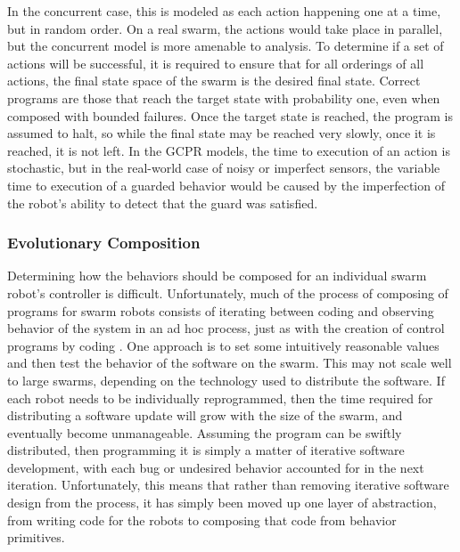\documentclass[]{article}
\begin{document}
In the concurrent case, this is modeled as each action happening one at a time, but in random order. 
On a real swarm, the actions would take place in parallel, but the concurrent model is more amenable to analysis. 
To determine if a set of actions will be successful, it is required to ensure that for all orderings of all actions, the final state space of the swarm is the desired final state. 
Correct programs are those that reach the target state with probability one, even when composed with bounded failures. 
Once the target state is reached, the program is assumed to halt, so while the final state may be reached very slowly, once it is reached, it is not left. 
In the GCPR models, the time to execution of an action is stochastic, but in the real-world case of noisy or imperfect sensors, the variable time to execution of a guarded behavior would be caused by the imperfection of the robot's ability to detect that the guard was satisfied. 


\subsubsection{Evolutionary Composition}

Determining how the behaviors should be composed for an individual swarm robot's controller is difficult. 
Unfortunately, much of the process of composing of programs for swarm robots consists of iterating between coding and observing behavior of the system in an ad hoc process, just as with the creation of control programs by coding \cite{palmer2005behavioral}. 
One approach is to set some intuitively reasonable values and then test the behavior of the software on the swarm. 
This may not scale well to large swarms, depending on the technology used to distribute the software. 
If each robot needs to be individually reprogrammed, then the time required for distributing a software update will grow with the size of the swarm, and eventually become unmanageable. 
Assuming the program can be swiftly distributed, then programming it is simply a matter of iterative software development, with each bug or undesired behavior accounted for in the next iteration. 
Unfortunately, this means that rather than removing iterative software design from the process, it has simply been moved up one layer of abstraction, from writing code for the robots to composing that code from behavior primitives. 
\end{document}
